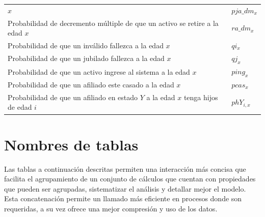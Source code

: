 \documentclass[
  letterpaper,
  DIV=11,
  numbers=noendperiod]{scrreprt}
\begin{document}
\begin{longtable}[]{@{}
  >{\raggedright\arraybackslash}p{}
  >{\raggedright\arraybackslash}p{}@{}}
\(x\) & \(pja\_dm_x\) \\
Probabilidad de decremento múltiple de que un activo se retire a la edad
\(x\) & \(ra\_dm_x\) \\
Probabilidad de que un inválido fallezca a la edad \(x\) & \(qi_x\) \\
Probabilidad de que un jubilado fallezca a la edad \(x\) & \(qj_x\) \\
Probabilidad de que un activo ingrese al sistema a la edad \(x\) &
\(ping_x\) \\
Probabilidad de que un afiliado este casado a la edad \(x\) &
\(pcas_x\) \\
Probabilidad de que un afiliado en estado \(Y\) a la edad \(x\) tenga
hijos de edad \(i\) & \(phY_{i,x}\) \\
\end{longtable}

\hypertarget{nombres-de-tablas}{%
\section{Nombres de tablas}\label{nombres-de-tablas}}

Las tablas a continuación descritas permiten una interacción más concisa
que facilita el agrupamiento de un conjunto de cálculos que cuentan con
propiedades que pueden ser agrupadas, sistematizar el análisis y
detallar mejor el modelo. Esta concatenación permite un llamado más
eficiente en procesos donde son requeridas, a su vez ofrece una mejor
compresión y uso de los datos.
\end{document}
